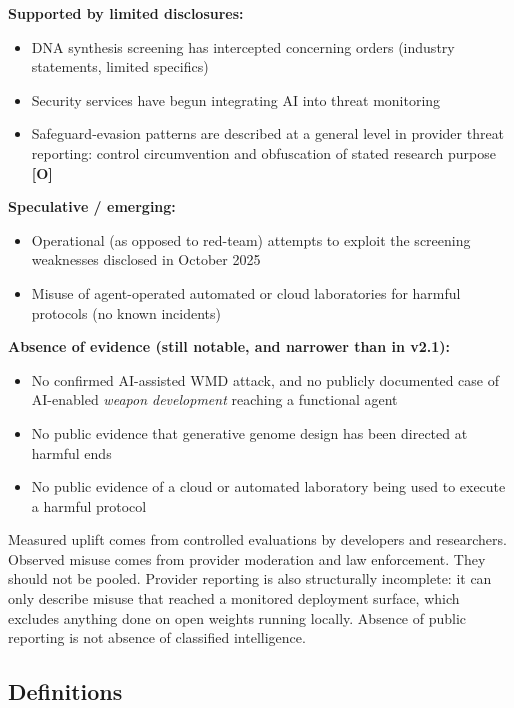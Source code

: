 \documentclass[11pt,letterpaper]{article}
\begin{document}
\textbf{Supported by limited disclosures:}
\begin{itemize}[nosep]
  \item DNA synthesis screening has intercepted concerning orders (industry statements, limited specifics)
  \item Security services have begun integrating AI into threat monitoring
  \item Safeguard-evasion patterns are described at a general level in provider threat reporting: control circumvention and obfuscation of stated research purpose \textbf{[O]}
\end{itemize}

\textbf{Speculative / emerging:}
\begin{itemize}[nosep]
  \item Operational (as opposed to red-team) attempts to exploit the screening weaknesses disclosed in October 2025
  \item Misuse of agent-operated automated or cloud laboratories for harmful protocols (no known incidents)
\end{itemize}

\textbf{Absence of evidence (still notable, and narrower than in v2.1):}
\begin{itemize}[nosep]
  \item No confirmed AI-assisted WMD attack, and no publicly documented case of AI-enabled \textit{weapon development} reaching a functional agent
  \item No public evidence that generative genome design has been directed at harmful ends
  \item No public evidence of a cloud or automated laboratory being used to execute a harmful protocol
\end{itemize}

\begin{notebox}
Measured uplift comes from controlled evaluations by developers and researchers. Observed misuse comes from provider moderation and law enforcement. They should not be pooled. Provider reporting is also structurally incomplete: it can only describe misuse that reached a monitored deployment surface, which excludes anything done on open weights running locally. Absence of public reporting is not absence of classified intelligence.
\end{notebox}

\subsection{Definitions}
\end{document}
